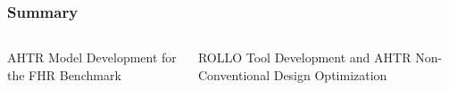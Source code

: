 \begin{frame}
    \frametitle{Summary}
    \begin{columns}
        \begin{column}{0.5\linewidth}
            \begin{block}{AHTR Model Development for the FHR Benchmark}
            \end{block}
        \end{column}
        \begin{column}{0.5\linewidth}
            \begin{block}{ROLLO Tool Development and AHTR Non-Conventional Design Optimization}
            \end{block}
        \end{column}
    \end{columns}
\end{frame}